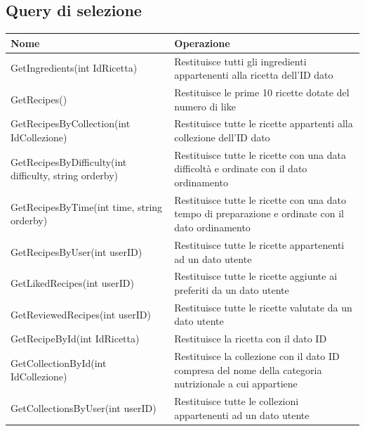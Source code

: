 ﻿\documentclass[a4paper,12pt]{report}
\begin{document}
\subsection{Query di selezione}
\begin{table}[h!]
    \centering
    \begin{tabular}{ |p{3in}|p{2in}| }
        \hline
        \scriptsize{\textbf{Nome}} & \scriptsize{\textbf{Operazione}} \\
        \hline
        \scriptsize{GetIngredients(int IdRicetta)} & \scriptsize{Restituisce tutti gli ingredienti appartenenti alla ricetta dell'ID dato} \\
        \hline
        \scriptsize{GetRecipes()} & \scriptsize{Restituisce le prime 10 ricette dotate del numero di like} \\
        \hline
        \scriptsize{GetRecipesByCollection(int IdCollezione)} & \scriptsize{Restituisce tutte le ricette appartenti alla collezione dell'ID dato} \\
        \hline
        \scriptsize{GetRecipesByDifficulty(int difficulty, string orderby)} & \scriptsize{Restituisce tutte le ricette con una data difficoltà e ordinate con il dato ordinamento} \\
        \hline
        \scriptsize{GetRecipesByTime(int time, string orderby)} & \scriptsize{Restituisce tutte le ricette con una dato tempo di preparazione e ordinate con il dato ordinamento} \\
        \hline
        \scriptsize{GetRecipesByUser(int userID)} & \scriptsize{Restituisce tutte le ricette appartenenti ad un dato utente} \\
        \hline
        \scriptsize{GetLikedRecipes(int userID)} & \scriptsize{Restituisce tutte le ricette aggiunte ai preferiti da un dato utente} \\
        \hline
        \scriptsize{GetReviewedRecipes(int userID)} & \scriptsize{Restituisce tutte le ricette valutate da un dato utente} \\
        \hline
        \scriptsize{GetRecipeById(int IdRicetta)} & \scriptsize{Restituisce la ricetta con il dato ID} \\
        \hline
        \scriptsize{GetCollectionById(int IdCollezione)} & \scriptsize{Restituisce la collezione con il dato ID compresa del nome della categoria nutrizionale a cui appartiene} \\
        \hline
        \scriptsize{GetCollectionsByUser(int userID)} & \scriptsize{Restituisce tutte le collezioni appartenenti ad un dato utente} \\

\end{tabular}
\end{table}
\end{document}
